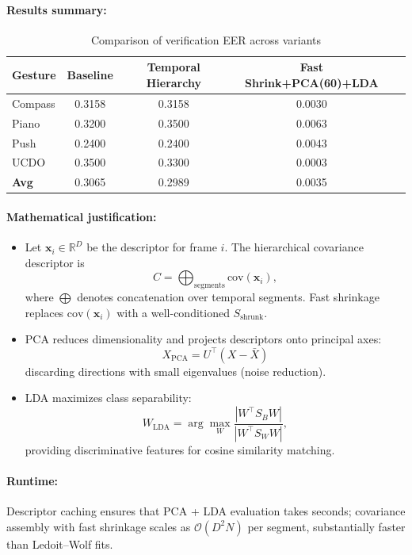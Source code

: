 \paragraph{Results summary:}
\begin{table}[h!]
\centering
\caption{Comparison of verification EER across variants}
\label{tab:eer_comparison}
\begin{tabular}{lcccc}
\hline
\textbf{Gesture} & \textbf{Baseline} & \textbf{Temporal Hierarchy} & \textbf{Fast Shrink+PCA(60)+LDA} \\
\hline
Compass & 0.3158 & 0.3158  & 0.0030 \\
Piano & 0.3200 & 0.3500  & 0.0063 \\
Push & 0.2400 & 0.2400  & 0.0043 \\
UCDO & 0.3500 & 0.3300  & 0.0003 \\
\hline
\textbf{Avg} & 0.3065 & 0.2989  & 0.0035 \\
\hline
\end{tabular}
\end{table}

\paragraph{Mathematical justification:}
\begin{itemize}
  \item Let $\mathbf{x}_i \in \mathbb{R}^D$ be the descriptor for frame $i$. The hierarchical covariance descriptor is
  \[
  C = \bigoplus_{\text{segments}} \text{cov}(\mathbf{x}_i),
  \]
  where $\bigoplus$ denotes concatenation over temporal segments.  
  Fast shrinkage replaces $\text{cov}(\mathbf{x}_i)$ with a well-conditioned $S_{\text{shrunk}}$.
  \item PCA reduces dimensionality and projects descriptors onto principal axes:
  \[
  X_{\text{PCA}} = U^\top (X - \bar{X})
  \]
  discarding directions with small eigenvalues (noise reduction).
  \item LDA maximizes class separability:
  \[
  W_{\text{LDA}} = \arg\max_W \frac{|W^\top S_B W|}{|W^\top S_W W|},
  \]
  providing discriminative features for cosine similarity matching.
\end{itemize}

\paragraph{Runtime:} Descriptor caching ensures that PCA + LDA evaluation takes seconds; covariance assembly with fast shrinkage scales as $\mathcal{O}(D^2 N)$ per segment, substantially faster than Ledoit–Wolf fits.

